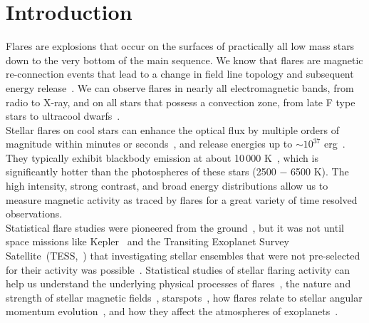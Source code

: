 \documentclass{aa}
\begin{document}
\section{Introduction}
Flares are explosions that occur on the surfaces of practically all low mass stars down to the very bottom of the main sequence. We know that flares are magnetic re-connection events that lead to a change in field line topology and subsequent energy release~\citep{priest_magnetic_2002}. We can observe flares in nearly all electromagnetic bands, from radio
to X-ray, and on all stars that possess a convection zone, from late F type stars to ultracool dwarfs~\citep{schaefer2000,benz2010,gizis2013}. 
\\
Stellar flares on cool stars can enhance the optical flux by multiple orders of magnitude within minutes or seconds~\citep{haisch1991, schmidt2019}, and release energies up to $\sim10^{37}$ erg~\citep{maehara2012, davenport_kepler_2016}. They typically exhibit blackbody emission at about 10\,000 K~\citep{hawley1992, kowalski2013}, which is significantly hotter than the photospheres of these stars (2500 $-$ 6500 K). The high intensity, strong contrast, and broad energy distributions allow us to measure magnetic activity as traced by flares for a great variety of time resolved observations.
\\
Statistical flare studies were pioneered from the ground~\citep{lacy_uv_1976}, but it was not until space missions like Kepler~\citep{koch2010} and the Transiting Exoplanet Survey Satellite~(TESS,~\citealt{ricker2014}) that investigating stellar ensembles that were not pre-selected for their activity was possible~\citep{walkowicz2011}. Statistical studies of stellar flaring activity can help us understand the underlying physical processes of flares~\citep{benz2010}, the nature and strength of stellar magnetic fields~\citep{berger2006, odert2017}, starspots~\citep{davenport_flaresandspots_2015, howard2020}, how flares relate to stellar angular momentum evolution~\citep{mondrik2019, howard2020}, and how they affect the atmospheres of exoplanets~\citep{lecavelier_flareescape_2012, loyd_mflaresplanetsfuv_2018, tilley_repeated_flare_2019, howard2019}.%
\end{document}
